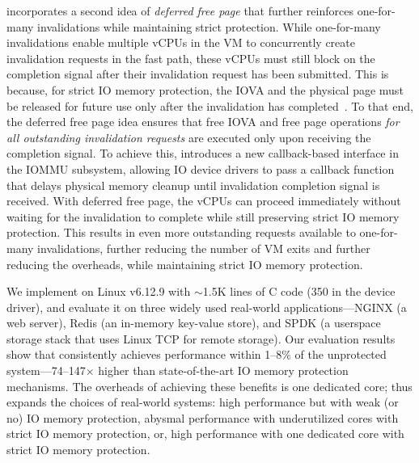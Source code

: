 {\vfreename} incorporates a second idea of \textit{deferred free page} that further reinforces one-for-many invalidations while maintaining strict protection. While one-for-many invalidations enable multiple vCPUs in the VM to concurrently create invalidation requests in the fast path, these vCPUs must still block on the completion signal after their invalidation request has been submitted. This is because, for strict IO memory protection, the IOVA and the physical page must be released for future use only after the invalidation has completed~\cite{Amit2011vIOMMU, malka2015efficient, Markuze2016true, markuze2018damn, RajapakshaIOMMU}. To that end, the deferred free page idea ensures that free IOVA and free page operations \textit{for all outstanding invalidation requests} are executed only upon receiving the completion signal. To achieve this, {\vfreename} introduces a new callback-based interface in the IOMMU subsystem, allowing IO device drivers to pass a callback function that delays physical memory cleanup until invalidation completion signal is received. With deferred free page, the vCPUs can proceed immediately without waiting for the invalidation to complete while still preserving strict IO memory protection. This results in even more outstanding requests available to one-for-many invalidations, further reducing the number of VM exits and further reducing the overheads, while maintaining strict IO memory protection. 

We implement \vfreebrand on Linux v6.12.9 with $\sim$1.5K lines of C code (350 in the device driver), 
    and evaluate it on three widely used real-world applications---NGINX (a web server), 
    Redis (an in-memory key-value store), and SPDK (a userspace storage stack that uses Linux TCP for remote storage). 
Our evaluation results show that {\vfreename} consistently achieves performance within 1--8$\%$ 
    of the unprotected system---74--147$\times$ higher than state-of-the-art IO memory protection mechanisms. 
    The overheads of achieving these benefits is one dedicated core; 
    {\vfreename} thus expands the choices of real-world systems: high performance 
    but with weak (or no) IO memory protection, abysmal performance with underutilized cores with strict IO memory protection, 
    or, high performance with one dedicated core with strict IO memory protection. 
